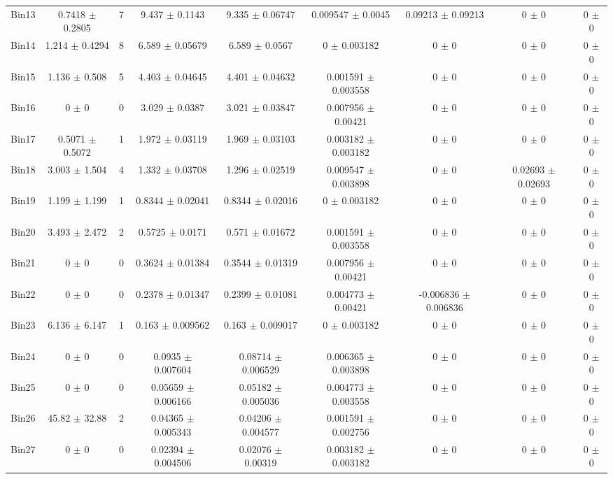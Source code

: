 \begin{tabular}{@{\extracolsep{4pt}}lcccccccc@{}}
     Bin13 & 0.7418 $\pm$ 0.2805 & 7 & 9.437 $\pm$ 0.1143 & 9.335 $\pm$ 0.06747 & 0.009547 $\pm$ 0.0045 & 0.09213 $\pm$ 0.09213 & 0 $\pm$ 0 & 0 $\pm$ 0 \\ 
     Bin14 & 1.214 $\pm$ 0.4294 & 8 & 6.589 $\pm$ 0.05679 & 6.589 $\pm$ 0.0567 & 0 $\pm$ 0.003182 & 0 $\pm$ 0 & 0 $\pm$ 0 & 0 $\pm$ 0 \\ 
     Bin15 & 1.136 $\pm$ 0.508 & 5 & 4.403 $\pm$ 0.04645 & 4.401 $\pm$ 0.04632 & 0.001591 $\pm$ 0.003558 & 0 $\pm$ 0 & 0 $\pm$ 0 & 0 $\pm$ 0 \\ 
     Bin16 & 0 $\pm$ 0 & 0 & 3.029 $\pm$ 0.0387 & 3.021 $\pm$ 0.03847 & 0.007956 $\pm$ 0.00421 & 0 $\pm$ 0 & 0 $\pm$ 0 & 0 $\pm$ 0 \\ 
     Bin17 & 0.5071 $\pm$ 0.5072 & 1 & 1.972 $\pm$ 0.03119 & 1.969 $\pm$ 0.03103 & 0.003182 $\pm$ 0.003182 & 0 $\pm$ 0 & 0 $\pm$ 0 & 0 $\pm$ 0 \\ 
     Bin18 & 3.003 $\pm$ 1.504 & 4 & 1.332 $\pm$ 0.03708 & 1.296 $\pm$ 0.02519 & 0.009547 $\pm$ 0.003898 & 0 $\pm$ 0 & 0.02693 $\pm$ 0.02693 & 0 $\pm$ 0 \\ 
     Bin19 & 1.199 $\pm$ 1.199 & 1 & 0.8344 $\pm$ 0.02041 & 0.8344 $\pm$ 0.02016 & 0 $\pm$ 0.003182 & 0 $\pm$ 0 & 0 $\pm$ 0 & 0 $\pm$ 0 \\ 
     Bin20 & 3.493 $\pm$ 2.472 & 2 & 0.5725 $\pm$ 0.0171 & 0.571 $\pm$ 0.01672 & 0.001591 $\pm$ 0.003558 & 0 $\pm$ 0 & 0 $\pm$ 0 & 0 $\pm$ 0 \\ 
     Bin21 & 0 $\pm$ 0 & 0 & 0.3624 $\pm$ 0.01384 & 0.3544 $\pm$ 0.01319 & 0.007956 $\pm$ 0.00421 & 0 $\pm$ 0 & 0 $\pm$ 0 & 0 $\pm$ 0 \\ 
     Bin22 & 0 $\pm$ 0 & 0 & 0.2378 $\pm$ 0.01347 & 0.2399 $\pm$ 0.01081 & 0.004773 $\pm$ 0.00421 & -0.006836 $\pm$ 0.006836 & 0 $\pm$ 0 & 0 $\pm$ 0 \\ 
     Bin23 & 6.136 $\pm$ 6.147 & 1 & 0.163 $\pm$ 0.009562 & 0.163 $\pm$ 0.009017 & 0 $\pm$ 0.003182 & 0 $\pm$ 0 & 0 $\pm$ 0 & 0 $\pm$ 0 \\ 
     Bin24 & 0 $\pm$ 0 & 0 & 0.0935 $\pm$ 0.007604 & 0.08714 $\pm$ 0.006529 & 0.006365 $\pm$ 0.003898 & 0 $\pm$ 0 & 0 $\pm$ 0 & 0 $\pm$ 0 \\ 
     Bin25 & 0 $\pm$ 0 & 0 & 0.05659 $\pm$ 0.006166 & 0.05182 $\pm$ 0.005036 & 0.004773 $\pm$ 0.003558 & 0 $\pm$ 0 & 0 $\pm$ 0 & 0 $\pm$ 0 \\ 
     Bin26 & 45.82 $\pm$ 32.88 & 2 & 0.04365 $\pm$ 0.005343 & 0.04206 $\pm$ 0.004577 & 0.001591 $\pm$ 0.002756 & 0 $\pm$ 0 & 0 $\pm$ 0 & 0 $\pm$ 0 \\ 
     Bin27 & 0 $\pm$ 0 & 0 & 0.02394 $\pm$ 0.004506 & 0.02076 $\pm$ 0.00319 & 0.003182 $\pm$ 0.003182 & 0 $\pm$ 0 & 0 $\pm$ 0 & 0 $\pm$ 0 \\ 

\end{tabular}

